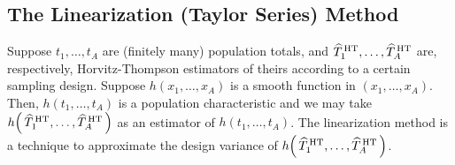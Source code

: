 

\subsection{The Linearization (Taylor Series) Method}

\vskip 0.2cm

Suppose $t_{1}, \ldots, t_{A}$ are (finitely many) population totals, and
$\widehat{T}^{\,\textnormal{HT}}_{1}, \ldots, \widehat{T}^{\,\textnormal{HT}}_{A}$
are, respectively, Horvitz-Thompson estimators of theirs according to a certain sampling design.
Suppose $h(x_{1},\ldots,x_{A})$ is a smooth function in $(x_{1},\ldots,x_{A})$.
Then, $h(t_{1},\ldots,t_{A})$ is a population characteristic and we may take
$h\!\left(\,\widehat{T}^{\,\textnormal{HT}}_{1}, \ldots, \widehat{T}^{\,\textnormal{HT}}_{A}\,\right)$
as an estimator of $h(t_{1},\ldots,t_{A})$.
The linearization method is a technique to approximate the design variance of
$h\!\left(\,\widehat{T}^{\,\textnormal{HT}}_{1}, \ldots, \widehat{T}^{\,\textnormal{HT}}_{A}\,\right)$.

